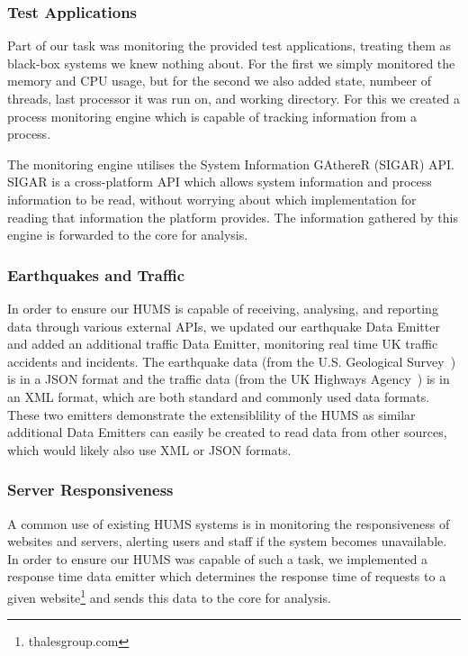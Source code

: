 \documentclass[10pt,a4paper]{article}
\begin{document}
\subsubsection{Test Applications} \label{subsec:tapp}
Part of our task was monitoring the provided test applications, treating them as black-box systems we knew nothing about. For the first we simply monitored the memory and CPU usage, but for the second we also added state, numbeer of threads, last processor it was run on, and working directory. For this we created a process monitoring engine which is capable of tracking information from a process.

The monitoring engine utilises the System Information GAthereR (SIGAR) API. SIGAR is a cross-platform API which allows system information and process information to be read, without worrying about which implementation for reading that information the platform provides. The information gathered by this engine is forwarded to the core for analysis.

\subsubsection{Earthquakes and Traffic}
In order to ensure our HUMS is capable of receiving, analysing, and reporting data through various external APIs, we updated our earthquake Data Emitter and added an additional traffic Data Emitter, monitoring real time UK traffic accidents and incidents. The earthquake data (from the U.S. Geological Survey~\cite{us_geo}) is in a JSON format and the traffic data (from the UK Highways Agency~\cite{ha_traffic}) is in an XML format, which are both standard and commonly used data formats. These two emitters demonstrate the extensiblility of the HUMS as similar additional Data Emitters can easily be created to read data from other sources, which would likely also use XML or JSON formats.

\subsubsection{Server Responsiveness}
A common use of existing HUMS systems is in monitoring the responsiveness of websites and servers, alerting users and staff if the system becomes unavailable. In order to ensure our HUMS was capable of such a task, we implemented a response time data emitter which determines the response time of requests to a given website\footnote{thalesgroup.com} and sends this data to the core for analysis.
\end{document}
